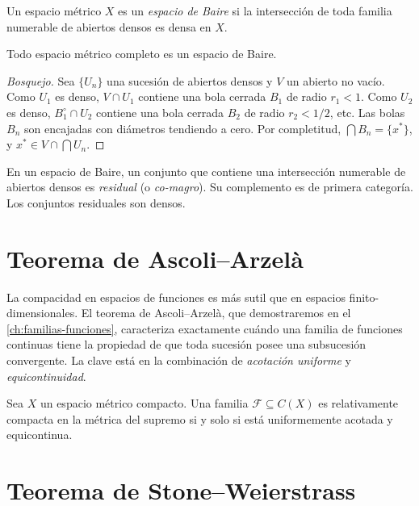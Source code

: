 \begin{definition}
\label{def:baire-space}
Un espacio métrico $X$ es un \emph{espacio de Baire} si la intersección de toda familia numerable de abiertos densos es densa en $X$.
\end{definition}

\begin{theorem}[Baire]
\label{teo:baire}
Todo espacio métrico completo es un espacio de Baire.
\end{theorem}
\begin{proof}[Bosquejo]
Sea $\{U_n\}$ una sucesión de abiertos densos y $V$ un abierto no vacío. Como $U_1$ es denso, $V\cap U_1$ contiene una bola cerrada $B_1$ de radio $r_1<1$. Como $U_2$ es denso, $B_1^{\circ}\cap U_2$ contiene una bola cerrada $B_2$ de radio $r_2<1/2$, etc. Las bolas $B_n$ son encajadas con diámetros tendiendo a cero. Por completitud, $\bigcap B_n=\{x^*\}$, y $x^*\in V\cap\bigcap U_n$.
\end{proof}

\begin{theorem}
\label{teo:residual}
En un espacio de Baire, un conjunto que contiene una intersección numerable de abiertos densos es \emph{residual} (o \emph{co-magro}). Su complemento es de primera categoría. Los conjuntos residuales son densos.
\end{theorem}

\section{Teorema de Ascoli--Arzelà}

La compacidad en espacios de funciones es más sutil que en espacios finito-dimensionales. El teorema de Ascoli--Arzelà, que demostraremos en el \cref{ch:familias-funciones}, caracteriza exactamente cuándo una familia de funciones continuas tiene la propiedad de que toda sucesión posee una subsucesión convergente. La clave está en la combinación de \emph{acotación uniforme} y \emph{equicontinuidad}.

\begin{theorem}
\label{teo:ascoli-arzela-enunciado}
Sea $X$ un espacio métrico compacto. Una familia $\mathcal{F}\subseteq C(X)$ es relativamente compacta en la métrica del supremo si y solo si está uniformemente acotada y equicontinua.
\end{theorem}

\section{Teorema de Stone--Weierstrass}

